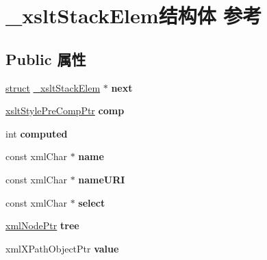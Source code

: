 \hypertarget{struct__xslt_stack_elem}{}\section{\+\_\+xslt\+Stack\+Elem结构体 参考}
\label{struct__xslt_stack_elem}
\subsection*{Public 属性}
\begin{DoxyCompactItemize}
\item 
\mbox{\label{struct__xslt_stack_elem_a5eea96e9531e08adf29f77ff49393896}} 
\hyperlink{interfacestruct}{struct} \hyperlink{struct__xslt_stack_elem}{\+\_\+xslt\+Stack\+Elem} $\ast$ {\bfseries next}
\item 
\mbox{\label{struct__xslt_stack_elem_a55638c992681dd41d6e3cc596719d521}} 
\hyperlink{struct__xslt_style_pre_comp}{xslt\+Style\+Pre\+Comp\+Ptr} {\bfseries comp}
\item 
\mbox{\label{struct__xslt_stack_elem_ad336e2a5bc7ce95a06d0a1307fbe2ac3}} 
int {\bfseries computed}
\item 
\mbox{\label{struct__xslt_stack_elem_aee8f79320640dc61f4d26dd125d6f6fb}} 
const xml\+Char $\ast$ {\bfseries name}
\item 
\mbox{\label{struct__xslt_stack_elem_aaf1e9d5d7cbb1a315b00e515501973aa}} 
const xml\+Char $\ast$ {\bfseries name\+U\+RI}
\item 
\mbox{\label{struct__xslt_stack_elem_adcd6b638b265f39a94ab525c0117f87f}} 
const xml\+Char $\ast$ {\bfseries select}
\item 
\mbox{\label{struct__xslt_stack_elem_a6205e951f8fb3c14ba4bba92443edaf7}} 
\hyperlink{struct__xml_node}{xml\+Node\+Ptr} {\bfseries tree}
\item 
\mbox{\label{struct__xslt_stack_elem_a88059966350a5aee35884e3cbb530e47}} 
xml\+X\+Path\+Object\+Ptr {\bfseries value}
\item 

\end{DoxyCompactItemize}
